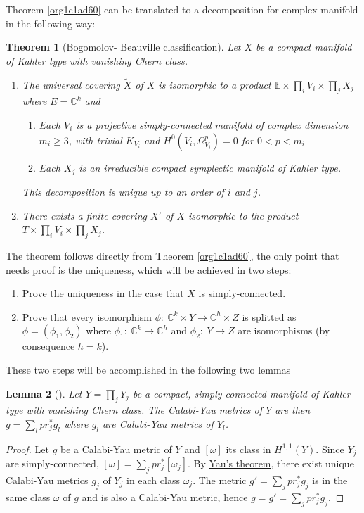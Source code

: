 \documentclass[11pt]{article}
\newtheorem{theorem}{Theorem}
\newtheorem{lemma}[theorem]{Lemma}
\begin{document}
Theorem \ref{org1c1ad60} can be translated to a decomposition for complex manifold in the following
way:
\begin{theorem}[Bogomolov- Beauville classification]
Let \(X\) be a compact manifold of Kahler type with vanishing Chern class.
\begin{enumerate}
\item The universal covering \(\tilde X\) of \(X\) is isomorphic to a product \(\mathbb{E}\times \prod_i
   V_i\times\prod_j X_j\) where \(E = \mathbb{C}^k\) and
\begin{enumerate}
\item Each \(V_i\) is a projective simply-connected manifold of complex dimension \(m_i\geq 3\), with trivial
\(K_{V_i}\) and \(H^0(V_i,\Omega_{V_i}^p) = 0\) for \(0 < p < m_i\)
\item Each \(X_j\) is an irreducible compact symplectic manifold of Kahler type.
\end{enumerate}
This decomposition is unique up to an order of \(i\) and \(j\).
\item There exists a finite covering \(X'\) of \(X\) isomorphic to the product \(T\times\prod_i
   V_i\times\prod_j X_j\).
\end{enumerate}
\end{theorem}
The theorem follows directly from Theorem \ref{org1c1ad60}, the only point that needs proof is the
uniqueness, which will be achieved in two steps:
\begin{enumerate}
\item Prove the uniqueness in the case that \(X\) is simply-connected.
\item Prove that every isomorphism \(\phi:\ \mathbb{C}^k\times Y\longrightarrow \mathbb{C}^h\times Z\) is
splitted as \(\phi = (\phi_1,\phi_2)\) where \(\phi_1:\ \mathbb{C}^k\longrightarrow \mathbb{C}^h\) and
\(\phi_2:\ Y\longrightarrow Z\) are isomorphisms (by consequence \(h=k\)).
\end{enumerate}
These two steps will be accomplished in the following two lemmas

\begin{lemma}[]
Let \(Y = \prod_j Y_j\) be a compact, simply-connected manifold of Kahler type with vanishing Chern
class. The Calabi-Yau metrics of \(Y\) are then \(g = \sum_l pr_j^*g_l\) where \(g_l\) are Calabi-Yau metrics
of \(Y_l\).
\end{lemma}
\begin{proof}
Let \(g\) be a Calabi-Yau metric of \(Y\) and \([\omega]\) its class in \(H^{1,1}(Y)\). Since \(Y_j\) are
simply-connected, \([\omega] = \sum_j pr_j^* [\omega_j]\). By \href{calabi-yau.org}{Yau's theorem}, there exist unique Calabi-Yau
metrics \(g_j\) of \(Y_j\) in each class \(\omega_j\). The metric \(g' = \sum_j pr_j^* g_j\) is in the same
class \(\omega\) of \(g\) and is also a Calabi-Yau metric, hence \(g= g' = \sum_j pr_j^*g_j\).
\end{proof}
\end{document}
